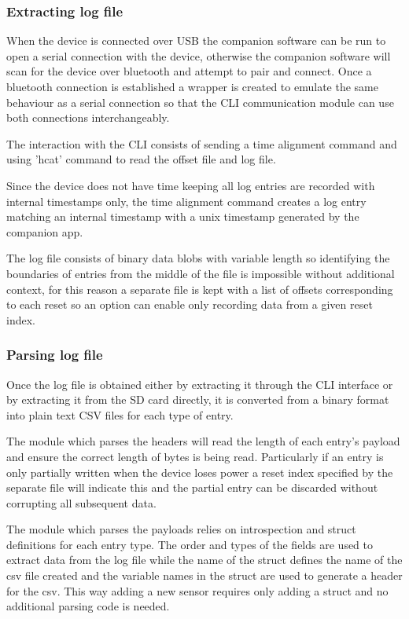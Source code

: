 
\subsubsection{Extracting log file}

When the device is connected over USB the companion software can be run to open a serial connection with the device, otherwise the companion software will scan for the device over bluetooth and attempt to pair and connect.  Once a bluetooth connection is established a wrapper is created to emulate the same behaviour as a serial connection so that the CLI communication module can use both connections interchangeably.

The interaction with the CLI consists of sending a time alignment command and using 'hcat' command to read the offset file and log file.  

Since the device does not have time keeping all log entries are recorded with internal timestamps only, the time alignment command creates a log entry matching an internal timestamp with a unix timestamp generated by the companion app.  

The log file consists of binary data blobs with variable length so identifying the boundaries of entries from the middle of the file is impossible without additional context, for this reason a separate file is kept with a list of offsets corresponding to each reset so an option can enable only recording data from a given reset index.

\subsubsection{Parsing log file}

Once the log file is obtained either by extracting it through the CLI interface or by extracting it from the SD card directly, it is converted from a binary format into plain text CSV files for each type of entry.

The module which parses the headers will read the length of each entry's payload and ensure the correct length of bytes is being read.  Particularly if an entry is only partially written when the device loses power a reset index specified by the separate file will indicate this and the partial entry can be discarded without corrupting all subsequent data.

The module which parses the payloads relies on introspection and struct definitions for each entry type.  The order and types of the fields are used to extract data from the log file while the name of the struct defines the name of the csv file created and the variable names in the struct are used to generate a header for the csv.  This way adding a new sensor requires only adding a struct and no additional parsing code is needed.

